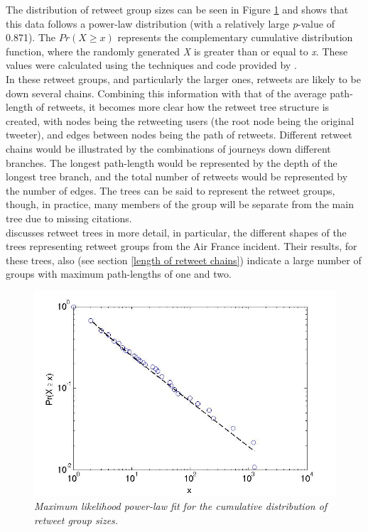 The distribution of retweet group sizes can be seen in Figure \ref{fig:retweet-distribution} and shows that this data follows a power-law distribution (with a relatively large \textit{p}-value of 0.871). The $Pr(X \geq x)$ represents the complementary cumulative distribution function, where the randomly generated \textit{X} is greater than or equal to \textit{x}. These values were calculated using the techniques and code provided by \cite{clauset07}.\\
In these retweet groups, and particularly the larger ones, retweets are likely to be down several chains. Combining this information with that of the average path-length of retweets, it becomes more clear how the retweet tree structure is created, with nodes being the retweeting users (the root node being the original tweeter), and edges between nodes being the path of retweets. Different retweet chains would be illustrated by the combinations of journeys down different branches. The longest path-length would be represented by the depth of the longest tree branch, and the total number of retweets would be represented by the number of edges. The trees can be said to represent the retweet groups, though, in practice, many members of the group will be separate from the main tree due to missing citations.\\
\cite{kwak10} discusses retweet trees in more detail, in particular, the different shapes of the trees representing retweet groups from the Air France incident. Their results, for these trees, also (see section \ref{length of retweet chains}) indicate a large number of groups with maximum path-lengths of one and two.\\
\begin{figure}[h]
\includegraphics[scale=0.35]{3.Chapter1/Media/retweets-distribution-stats.jpg} 
\caption{\textit{Maximum likelihood power-law fit for the cumulative distribution of retweet group sizes.}}
\label{fig:retweet-distribution}
\end{figure}

